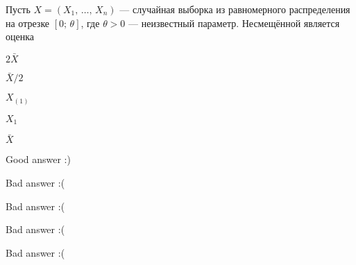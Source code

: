 
\begin{question}
Пусть \(X = (X_1, \, \ldots, \, X_n)\) --- случайная выборка из
равномерного распределения на отрезке \([0; \, \theta]\), где
\(\theta > 0\) --- неизвестный параметр. Несмещённой является оценка
\begin{answerlist}
  \item \(2 \bar{X}\)
  \item \(\bar{X} / 2\)
  \item \(X_{(1)}\)
  \item \(X_{1}\)
  \item \(\bar{X}\)
\end{answerlist}
\end{question}

\begin{solution}
\begin{answerlist}
  \item Good answer :)
  \item Bad answer :(
  \item Bad answer :(
  \item Bad answer :(
  \item Bad answer :(
\end{answerlist}
\end{solution}

